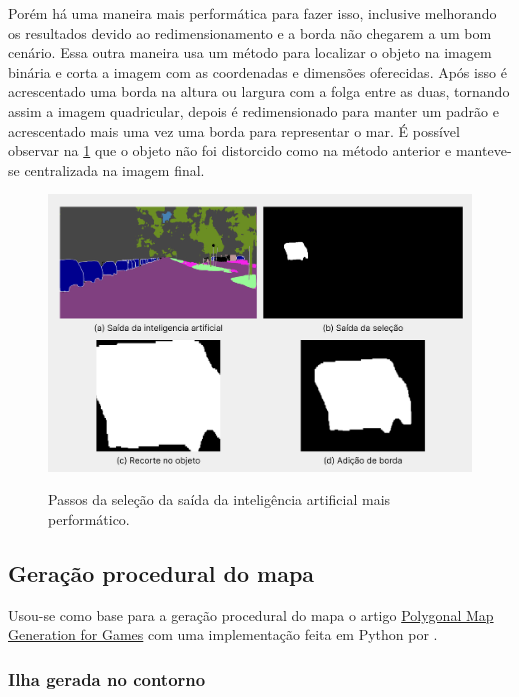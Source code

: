Porém há uma maneira mais performática para fazer isso, inclusive melhorando os resultados devido ao redimensionamento e a borda não chegarem a um bom cenário. Essa outra maneira usa um método para localizar o objeto na imagem binária e corta a imagem com as coordenadas e dimensões oferecidas. Após isso é acrescentado uma borda na altura ou largura com a folga entre as duas, tornando assim a imagem quadricular, depois é redimensionado para manter um padrão e acrescentado mais uma vez uma borda para representar o mar. É possível observar na \cref{fig:saidas_selecao_perf} que o objeto não foi distorcido como na método anterior e manteve-se centralizada na imagem final.

\begin{figure}[!ht]
	\centering
    \caption{Passos da seleção da saída da inteligência  artificial mais performático.}
	\includegraphics[width=1.0\textwidth]{figures/saidas_selecao_2.png}
	\label{fig:saidas_selecao_perf}
\end{figure}

\subsection{Geração procedural do mapa}

Usou-se como base para a geração procedural do mapa o artigo \hyperref[sec:geracao_procedural_biomas]{Polygonal Map Generation for Games} com uma implementação feita em Python por .

\subsubsection{Ilha gerada no contorno}

